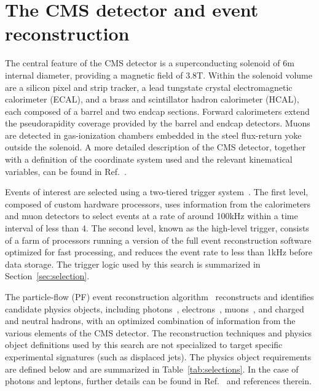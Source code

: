 
\section{The CMS detector and event reconstruction}
\label{sec:reconstruction}

The central feature of the CMS detector is a superconducting solenoid
of 6\unit{m} internal diameter, providing a magnetic field of
3.8\unit{T}. Within the solenoid volume are a silicon pixel and strip
tracker, a lead tungstate crystal electromagnetic calorimeter (ECAL),
and a brass and scintillator hadron calorimeter (HCAL), each composed
of a barrel and two endcap sections. Forward calorimeters extend the
pseudorapidity coverage provided by the barrel and endcap
detectors. Muons are detected in gas-ionization chambers embedded in
the steel flux-return yoke outside the solenoid. A more detailed
description of the CMS detector, together with a definition of the
coordinate system used and the relevant kinematical variables, can be
found in Ref.~\cite{Chatrchyan:2008zzk}.

Events of interest are selected using a two-tiered trigger
system~\cite{Khachatryan:2016bia}. The first level, composed of custom
hardware processors, uses information from the calorimeters and muon
detectors to select events at a rate of around 100\unit{kHz} within a
time interval of less than 4\mus. The second level, known as the
high-level trigger, consists of a farm of processors running a version
of the full event reconstruction software optimized for fast
processing, and reduces the event rate to less than 1\unit{kHz} before
data storage. The trigger logic used by this search is summarized in
Section~\ref{sec:selection}.

The particle-flow (PF) event reconstruction
algorithm~\cite{CMS-PRF-14-001} reconstructs and identifies candidate
physics objects, including photons~\cite{Khachatryan:2015iwa},
electrons~\cite{Khachatryan:2015hwa}, muons~\cite{Chatrchyan:2012xi},
and charged and neutral hadrons, with an optimized combination of
information from the various elements of the CMS detector. The
reconstruction techniques and physics object definitions used by this
search are not specialized to target specific experimental signatures
(such as displaced jets). The physics object requirements are defined
below and are summarized in Table~\ref{tab:selections}. In the case of
photons and leptons, further details can be found in
Ref.~\cite{Khachatryan:2016dvc} and references therein.


